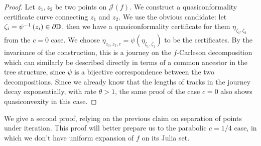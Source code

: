 \begin{proof}
Let $z_{1},z_{2}$ be two points on $\mathcal{J}(f)$. We construct
a quasiconformality certificate curve connecting $z_{1}$ and $z_{2}$.
We use the obvious candidate: let $\zeta_{i}=\psi^{-1}\left(z_{i}\right)\in\partial\mathbb{D}$,
then we have a quasiconformality certificate for them $\eta_{\zeta_{1},\zeta_{2}}$
from the $c=0$ case. We choose $\eta_{z_{1},z_{2},c}=\psi(\eta_{\zeta_{1},\zeta_{2}})$
to be the certificates. By the invariance of the construction, this is
a journey on the $f$-Carleson decomposition which can similarly
be described directly in terms of a common ancestor in the tree structure,
since $\psi$ is a bijective correspondence between the two decompositions.
Since we already know that the lengths of tracks in the journey decay
exponentially, with rate $\theta>1$, the same proof of the case $c=0$
also shows quasiconvexity in this case.
\end{proof}
%
We give a second proof, relying on the previous claim on separation
of points under iteration. This proof will better prepare us to the
parabolic $c=1/4$ case, in which we don't have uniform expansion
of $f$ on its Julia set.
